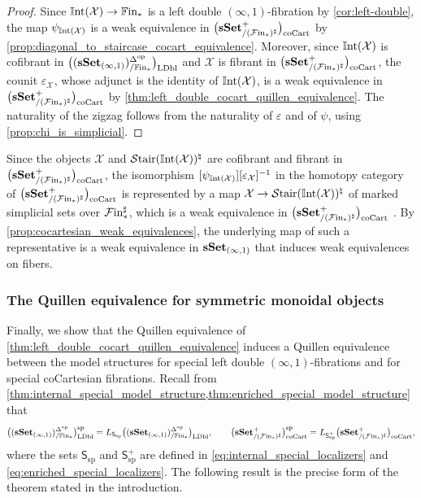 \documentclass[10pt,reqno]{amsart}
\begin{document}
\begin{proof}
Since $\mathbb{I}\mathrm{nt}(\mathcal X)\to\mathbb{F}\mathrm{in}_*$ is a left double
$(\infty,1)$-fibration by \cref{cor:left-double}, the map
$\psi_{\mathbb{I}\mathrm{nt}(\mathcal X)}$ is a weak equivalence in $\bigl(\mathbf{sSet}^+_{/(\mathcal{F}\mathrm{in}_*)^\sharp}\bigr)_{\mathrm{coCart}}$ by
\cref{prop:diagonal_to_staircase_cocart_equivalence}. Moreover, since
$\mathbb{I}\mathrm{nt}(\mathcal X)$ is cofibrant in $\bigl((\mathbf{sSet}_{(\infty,1)})^{\Delta^{\mathrm{op}}}_{/\mathbb{F}\mathrm{in}_*}\bigr)_{\mathrm{LDbl}}$ and $\mathcal X$ is
fibrant in $\bigl(\mathbf{sSet}^+_{/(\mathcal{F}\mathrm{in}_*)^\sharp}\bigr)_{\mathrm{coCart}}$, the counit $\varepsilon_{\mathcal X}$, whose
adjunct is the identity of $\mathbb{I}\mathrm{nt}(\mathcal X)$, is a weak equivalence
in $\bigl(\mathbf{sSet}^+_{/(\mathcal{F}\mathrm{in}_*)^\sharp}\bigr)_{\mathrm{coCart}}$ by \cref{thm:left_double_cocart_quillen_equivalence}.
The naturality of the zigzag follows from the naturality of
$\varepsilon$ and of $\psi$, using \cref{prop:chi_is_simplicial}.
\end{proof}

\begin{rmk}
\label{rem:second_roundtrip_single_map}
Since the objects $\mathcal X$ and
$\mathcal{S}\mathrm{tair}(\mathbb{I}\mathrm{nt}(\mathcal X))^\natural$ are cofibrant and fibrant in
$\bigl(\mathbf{sSet}^+_{/(\mathcal{F}\mathrm{in}_*)^\sharp}\bigr)_{\mathrm{coCart}}$, the isomorphism
$[\psi_{\mathbb{I}\mathrm{nt}(\mathcal X)}][\varepsilon_{\mathcal X}]^{-1}$ in the
homotopy category of $\bigl(\mathbf{sSet}^+_{/(\mathcal{F}\mathrm{in}_*)^\sharp}\bigr)_{\mathrm{coCart}}$ is represented by a map
$\mathcal X\to\mathcal{S}\mathrm{tair}(\mathbb{I}\mathrm{nt}(\mathcal X))^\natural$ of marked
simplicial sets over $\mathcal{F}\mathrm{in}_*^\sharp$, which is a weak equivalence
in $\bigl(\mathbf{sSet}^+_{/(\mathcal{F}\mathrm{in}_*)^\sharp}\bigr)_{\mathrm{coCart}}$ \cite[Theorem~1.2.10\textup{(ii), (iv)}]{hovey1999model}.
By \cref{prop:cocartesian_weak_equivalences}, the underlying map of
such a representative is a weak equivalence in $\mathbf{sSet}_{(\infty,1)}$
that induces weak equivalences on fibers.
\end{rmk}

\subsubsection{The Quillen equivalence for symmetric monoidal objects}
\label{subsubsec:special_localizations}

Finally, we show that the Quillen equivalence of
\cref{thm:left_double_cocart_quillen_equivalence} induces a Quillen
equivalence between the model structures for special left double
$(\infty,1)$-fibrations and for special coCartesian fibrations.
Recall from
\cref{thm:internal_special_model_structure,thm:enriched_special_model_structure}
that
\[
 \bigl((\mathbf{sSet}_{(\infty,1)})^{\Delta^{\mathrm{op}}}_{/\mathbb{F}\mathrm{in}_*}\bigr)_{\mathrm{LDbl}}^{\mathrm{sp}}=L_{\mathsf S_{\mathrm{sp}}}\bigl((\mathbf{sSet}_{(\infty,1)})^{\Delta^{\mathrm{op}}}_{/\mathbb{F}\mathrm{in}_*}\bigr)_{\mathrm{LDbl}},
 \qquad
 \bigl(\mathbf{sSet}^+_{/(\mathcal{F}\mathrm{in}_*)^\sharp}\bigr)_{\mathrm{coCart}}^{\mathrm{sp}}=L_{\mathsf S^+_{\mathrm{sp}}}\bigl(\mathbf{sSet}^+_{/(\mathcal{F}\mathrm{in}_*)^\sharp}\bigr)_{\mathrm{coCart}},
\]
where the sets $\mathsf S_{\mathrm{sp}}$ and
$\mathsf S^+_{\mathrm{sp}}$ are defined in
\eqref{eq:internal_special_localizers} and
\eqref{eq:enriched_special_localizers}. The following result is the
precise form of the theorem stated in the introduction.
\end{document}
